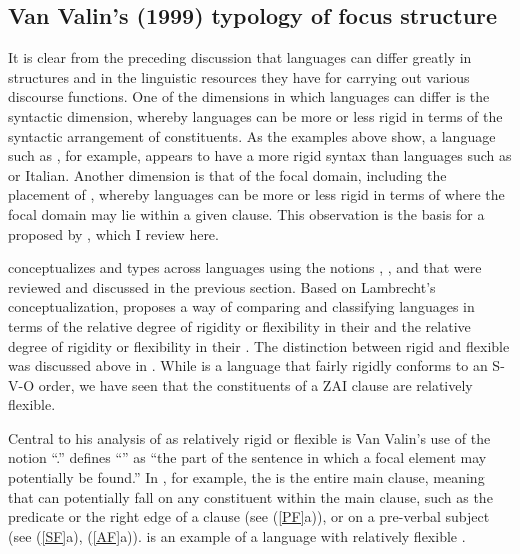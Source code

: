 \subsection{Van Valin's (1999) typology of focus structure}

It is clear from the preceding discussion that languages can differ greatly in  structures and in the linguistic resources they have for carrying out various discourse functions. One of the dimensions in which languages can differ is the syntactic dimension, whereby languages can be more or less rigid in terms of the syntactic arrangement of constituents. As the examples above show, a language such as , for example, appears to have a more rigid syntax than languages such as  or Italian. Another dimension is that of the focal domain, including the placement of , whereby languages can be more or less rigid in terms of where the focal domain may lie within a given clause. This observation is the basis for a  proposed by \citet{vanvalin1999}, which I review here. 

 
\citet{lambrecht1994} conceptualizes  and  types across languages using the notions , , and  that were reviewed and discussed in the previous section. Based on Lambrecht's conceptualization, \citet{vanvalin1999} proposes a way of comparing and classifying languages in terms of the relative degree of rigidity or flexibility in their  and the relative degree of rigidity or flexibility in their . The distinction between rigid and flexible  was discussed above in . While  is a language that fairly rigidly conforms to an S-V-O order, we have seen that the constituents of a ZAI clause are relatively flexible.

Central to his analysis of  as relatively rigid or flexible is Van Valin's use of the notion ``.'' \citet[513]{vanvalin1999} defines ``'' as ``the part of the sentence in which a focal element may potentially be found.'' In , for example, the  is the entire main clause, meaning that  can potentially fall on any constituent within the main clause, such as the predicate or the right edge of a clause (see (\ref{PF}a)), or on a pre-verbal subject (see (\ref{SF}a), (\ref{AF}a)).  is an example of a language with relatively flexible . 

